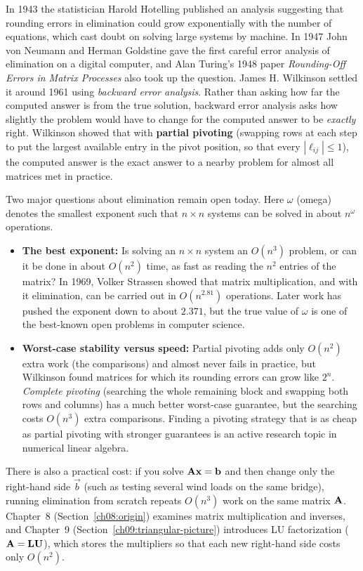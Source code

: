 \begin{historybox}
In 1943 the statistician Harold Hotelling published an analysis suggesting that
rounding errors in elimination could grow exponentially with the number of
equations, which cast doubt on solving large systems by machine. In 1947 John von
Neumann and Herman Goldstine gave the first careful error analysis of
elimination on a digital computer, and Alan Turing's 1948 paper
\emph{Rounding-Off Errors in Matrix Processes} also took up the question. James H.
Wilkinson settled it around 1961 using \emph{backward error analysis}. Rather than
asking how far the computed answer is from the true solution, backward error
analysis asks how slightly the problem would have to change for the computed answer
to be \emph{exactly} right. Wilkinson showed that with \textbf{partial pivoting}
(swapping rows at each step to put the largest available entry in the pivot position,
so that every $|\ell_{ij}| \le 1$), the computed answer is the exact answer to a
nearby problem for almost all matrices met in practice.

Two major questions about elimination remain open today. Here $\omega$ (omega)
denotes the smallest exponent such that $n\times n$ systems can be solved in about
$n^{\omega}$ operations.
\begin{itemize}
  \item \textbf{The best exponent:} Is solving an $n\times n$ system an
  $O(n^3)$ problem, or can it be done in about $O(n^2)$ time, as fast as reading the $n^2$
  entries of the matrix? In 1969, Volker Strassen showed that matrix multiplication,
  and with it elimination, can be carried out in $O(n^{2.81})$ operations. Later work
  has pushed the exponent down to about $2.371$, but the true value of $\omega$ is
  one of the best-known open problems in computer science.
  \item \textbf{Worst-case stability versus speed:} Partial pivoting adds only
  $O(n^2)$ extra work (the comparisons) and almost never fails in practice, but
  Wilkinson found matrices for which its rounding errors can grow like $2^{n}$.
  \emph{Complete pivoting} (searching the whole remaining block and swapping both
  rows and columns) has a much better worst-case guarantee, but the searching costs
  $O(n^3)$ extra comparisons. Finding a pivoting strategy that is as cheap as partial
  pivoting with stronger guarantees is an active research topic in numerical linear algebra.
\end{itemize}

There is also a practical cost: if you solve $\mathbf{A}\mathbf{x}=\mathbf{b}$ and then change only the right-hand side $\vec{b}$ (such
as testing several wind loads on the same bridge), running elimination from scratch repeats
$O(n^3)$ work on the same matrix $\mathbf{A}$. Chapter~8 (Section~\ref{ch08:origin}) examines matrix
multiplication and inverses, and Chapter~9 (Section~\ref{ch09:triangular-picture}) introduces
LU factorization ($\mathbf{A} = \mathbf{L}\mathbf{U}$), which stores the multipliers so that
each new right-hand side costs only $O(n^2)$.
\end{historybox}

